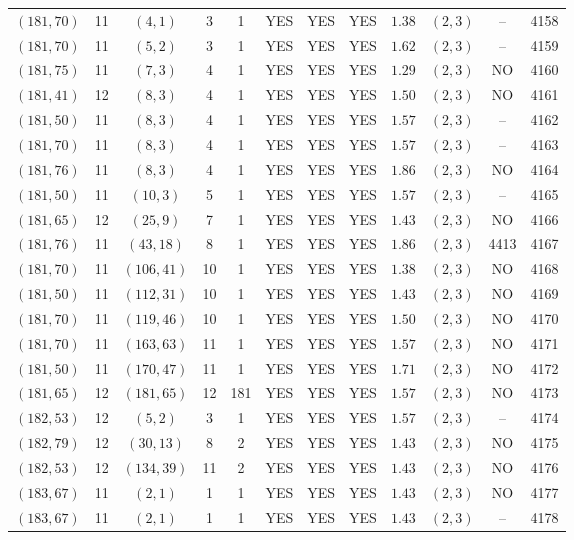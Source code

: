 \begin{longtable}{|c|c|c|c|c|c|c|c|c|c|c|c|}
$(181,70)$ & 11 & $(4,1)$ & 3 & 1 & YES & YES & YES & $1.38$ & $(2,3)$ & -- & 4158\\
$(181,70)$ & 11 & $(5,2)$ & 3 & 1 & YES & YES & YES & $1.62$ & $(2,3)$ & -- & 4159\\
$(181,75)$ & 11 & $(7,3)$ & 4 & 1 & YES & YES & YES & $1.29$ & $(2,3)$ & NO & 4160\\
$(181,41)$ & 12 & $(8,3)$ & 4 & 1 & YES & YES & YES & $1.50$ & $(2,3)$ & NO & 4161\\
$(181,50)$ & 11 & $(8,3)$ & 4 & 1 & YES & YES & YES & $1.57$ & $(2,3)$ & -- & 4162\\
$(181,70)$ & 11 & $(8,3)$ & 4 & 1 & YES & YES & YES & $1.57$ & $(2,3)$ & -- & 4163\\
$(181,76)$ & 11 & $(8,3)$ & 4 & 1 & YES & YES & YES & $1.86$ & $(2,3)$ & NO & 4164\\
$(181,50)$ & 11 & $(10,3)$ & 5 & 1 & YES & YES & YES & $1.57$ & $(2,3)$ & -- & 4165\\
$(181,65)$ & 12 & $(25,9)$ & 7 & 1 & YES & YES & YES & $1.43$ & $(2,3)$ & NO & 4166\\
$(181,76)$ & 11 & $(43,18)$ & 8 & 1 & YES & YES & YES & $1.86$ & $(2,3)$ & 4413 & 4167\\
$(181,70)$ & 11 & $(106,41)$ & 10 & 1 & YES & YES & YES & $1.38$ & $(2,3)$ & NO & 4168\\
$(181,50)$ & 11 & $(112,31)$ & 10 & 1 & YES & YES & YES & $1.43$ & $(2,3)$ & NO & 4169\\
$(181,70)$ & 11 & $(119,46)$ & 10 & 1 & YES & YES & YES & $1.50$ & $(2,3)$ & NO & 4170\\
$(181,70)$ & 11 & $(163,63)$ & 11 & 1 & YES & YES & YES & $1.57$ & $(2,3)$ & NO & 4171\\
$(181,50)$ & 11 & $(170,47)$ & 11 & 1 & YES & YES & YES & $1.71$ & $(2,3)$ & NO & 4172\\
$(181,65)$ & 12 & $(181,65)$ & 12 & 181 & YES & YES & YES & $1.57$ & $(2,3)$ & NO & 4173\\
$(182,53)$ & 12 & $(5,2)$ & 3 & 1 & YES & YES & YES & $1.57$ & $(2,3)$ & -- & 4174\\
$(182,79)$ & 12 & $(30,13)$ & 8 & 2 & YES & YES & YES & $1.43$ & $(2,3)$ & NO & 4175\\
$(182,53)$ & 12 & $(134,39)$ & 11 & 2 & YES & YES & YES & $1.43$ & $(2,3)$ & NO & 4176\\
$(183,67)$ & 11 & $(2,1)$ & 1 & 1 & YES & YES & YES & $1.43$ & $(2,3)$ & NO & 4177\\
$(183,67)$ & 11 & $(2,1)$ & 1 & 1 & YES & YES & YES & $1.43$ & $(2,3)$ & -- & 4178\\

\end{longtable}
